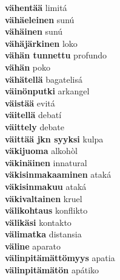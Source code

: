 \textbf{ vähentää  } limitá \\
\textbf{ vähäeleinen  } sunú \\
\textbf{ vähäinen  } sunú \\
\textbf{ vähäjärkinen  } loko \\
\textbf{ vähän tunnettu  } profundo \\
\textbf{ vähän  } poko \\
\textbf{ vähätellä  } bagatelisá \\
\textbf{ väinönputki  } arkangel \\
\textbf{ väistää  } evitá \\
\textbf{ väitellä  } debatí \\
\textbf{ väittely  } debate \\
\textbf{ väittää jkn syyksi  } kulpa \\
\textbf{ väkijuoma  } alkohòl \\
\textbf{ väkinäinen  } innatural \\
\textbf{ väkisinmakaaminen  } ataká \\
\textbf{ väkisinmakuu  } ataká \\
\textbf{ väkivaltainen  } kruel \\
\textbf{ välikohtaus  } konflikto \\
\textbf{ välikäsi  } kontakto \\
\textbf{ välimatka  } distansia \\
\textbf{ väline  } aparato \\
\textbf{ välinpitämättömyys  } apatia \\
\textbf{ välinpitämätön  } apátiko \\
